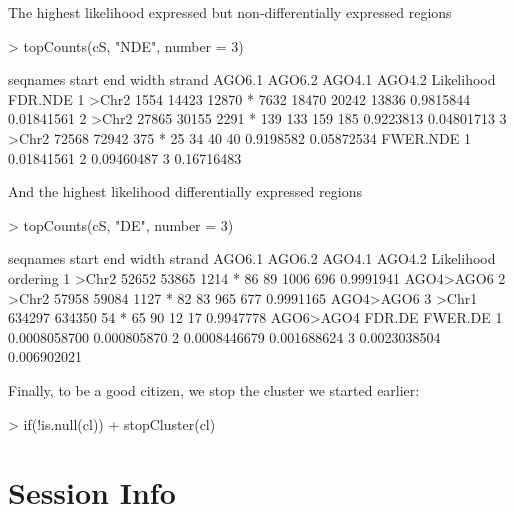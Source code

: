 \documentclass[a4paper]{article}
\begin{document}
The highest likelihood expressed but non-differentially expressed regions

\begin{Schunk}
\begin{Sinput}
> topCounts(cS, "NDE", number = 3)
\end{Sinput}
\begin{Soutput}
  seqnames start   end width strand AGO6.1 AGO6.2 AGO4.1 AGO4.2 Likelihood    FDR.NDE
1    >Chr2  1554 14423 12870      *   7632  18470  20242  13836  0.9815844 0.01841561
2    >Chr2 27865 30155  2291      *    139    133    159    185  0.9223813 0.04801713
3    >Chr2 72568 72942   375      *     25     34     40     40  0.9198582 0.05872534
    FWER.NDE
1 0.01841561
2 0.09460487
3 0.16716483
\end{Soutput}
\end{Schunk}

And the highest likelihood differentially expressed regions

\begin{Schunk}
\begin{Sinput}
> topCounts(cS, "DE", number = 3)
\end{Sinput}
\begin{Soutput}
  seqnames  start    end width strand AGO6.1 AGO6.2 AGO4.1 AGO4.2 Likelihood  ordering
1    >Chr2  52652  53865  1214      *     86     89   1006    696  0.9991941 AGO4>AGO6
2    >Chr2  57958  59084  1127      *     82     83    965    677  0.9991165 AGO4>AGO6
3    >Chr1 634297 634350    54      *     65     90     12     17  0.9947778 AGO6>AGO4
        FDR.DE     FWER.DE
1 0.0008058700 0.000805870
2 0.0008446679 0.001688624
3 0.0023038504 0.006902021
\end{Soutput}
\end{Schunk}

Finally, to be a good citizen, we stop the cluster we started earlier:

\begin{Schunk}
\begin{Sinput}
> if(!is.null(cl))
+     stopCluster(cl)
\end{Sinput}
\end{Schunk}

\section*{Session Info}
\end{document}
